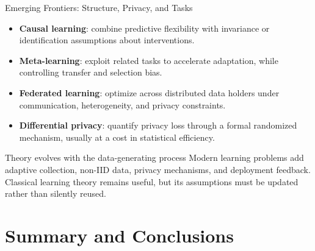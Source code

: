 \documentclass[aspectratio=169,11pt]{beamer}
\begin{document}
\begin{frame}{Emerging Frontiers: Structure, Privacy, and Tasks}
\begin{itemize}
  \item \textbf{Causal learning}: combine predictive flexibility with invariance or identification assumptions about interventions.
  \item \textbf{Meta-learning}: exploit related tasks to accelerate adaptation, while controlling transfer and selection bias.
  \item \textbf{Federated learning}: optimize across distributed data holders under communication, heterogeneity, and privacy constraints.
  \item \textbf{Differential privacy}: quantify privacy loss through a formal randomized mechanism, usually at a cost in statistical efficiency.
\end{itemize}

\begin{block}{Theory evolves with the data-generating process}
Modern learning problems add adaptive collection, non-IID data, privacy mechanisms, and deployment feedback. Classical learning theory remains useful, but its assumptions must be updated rather than silently reused.
\end{block}
\end{frame}

\section{Summary and Conclusions}
\end{document}
